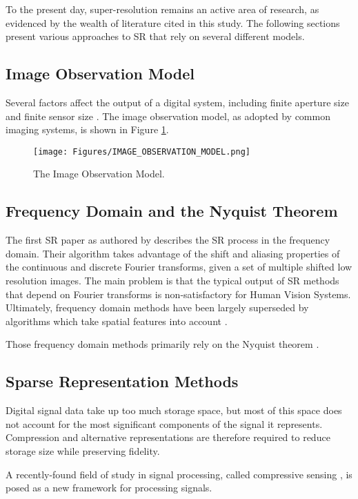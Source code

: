 To the present day, super-resolution remains an active area of research, as evidenced by the wealth of literature cited in this study. 
The following sections present various approaches to SR that rely on several different models.

\subsection{Image Observation Model}

Several factors affect the output of a digital system, including finite aperture size and finite sensor size \citep{Yang2010a}. 
The image observation model, as adopted by common imaging systems, is shown in Figure \ref{fig:IOM}.

\begin{figure}[ht]
	\centering
	\texttt{[image: Figures/IMAGE\_OBSERVATION\_MODEL.png]}
	\caption[]{The Image Observation Model.}
	\label{fig:IOM}
\end{figure}

\subsection{Frequency Domain and the Nyquist Theorem}
The first SR paper as authored by \cite{tsai1984multiframe} describes the SR process in the frequency domain. 
Their algorithm takes advantage of the shift and aliasing properties of the continuous and discrete Fourier transforms, given a set of multiple shifted low resolution images. 
The main problem is that the typical output of SR methods that depend on Fourier transforms is non-satisfactory for Human Vision Systems.
Ultimately, frequency domain methods have been largely superseded by algorithms which take spatial features into account \citep{Yang2010a}.

Those frequency domain methods primarily rely on the Nyquist theorem \citep{Nyquist1928}.

\subsection{Sparse Representation Methods}

Digital signal data take up too much storage space, but most of this space does not account for the most significant components of the signal it represents.
Compression and alternative representations are therefore required to reduce storage size while preserving fidelity. 

A recently-found field of study in signal processing, called compressive sensing \cite{Baraniuk2011}, is posed as a new framework for processing signals.
	
